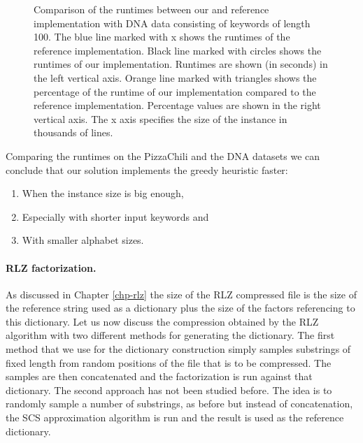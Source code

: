 \documentclass[english,twoside,censored,csm,algorithms-track-2020]{HYthesisML}
\theoremstyle{plain}
\theoremstyle{definition}
\numberwithin{testexample}{chapter}
\begin{document}
\begin{figure}[t]
\caption{Comparison of the runtimes between our and reference implementation with DNA data consisting
  of keywords of length 100. The blue line marked with x shows the runtimes of the reference
  implementation. Black line marked with circles shows the runtimes of our implementation. Runtimes are
  shown (in seconds) in the left vertical axis. Orange line marked with triangles shows the percentage
  of the runtime of our implementation compared to the reference implementation. Percentage values
  are shown in the right vertical axis. The x axis specifies the size of the instance in thousands
  of lines. }
  \label{fig-dna}
\end{figure}

  Comparing the runtimes on the PizzaChili and the DNA datasets we can conclude that
  our solution implements the greedy heuristic faster:

  \begin{enumerate}
  \item When the instance size is big enough,
  \item Especially with shorter input keywords and
  \item With smaller alphabet sizes.
  \end{enumerate}

\paragraph{RLZ factorization.}
As discussed in Chapter \ref{chp-rlz} the size of the RLZ compressed file is the size of the reference
string used as a dictionary plus the size of the factors referencing to this dictionary. Let us now
discuss the compression obtained by the RLZ algorithm with two different methods for generating the dictionary.
The first method that we use for the dictionary construction simply samples substrings of
fixed length from random positions of the file that is to be compressed.
The samples are then concatenated and the
factorization is run against that dictionary. The second approach has not been studied before. The
idea is to randomly sample a number of substrings, as before but instead of
concatenation, the SCS approximation algorithm is run and the result is used as the reference
dictionary.
\end{document}
